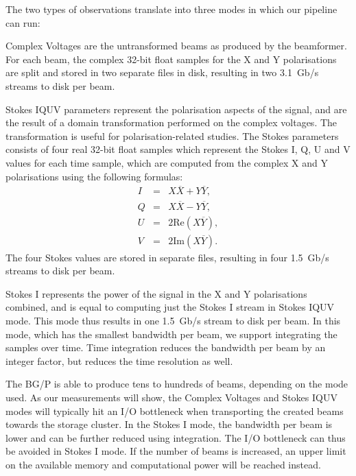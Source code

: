 \documentclass{llncs}
\begin{document}
The two types of observations translate into three modes in which our pipeline can run:
\begin{description}
\item{Complex Voltages} are the untransformed beams as produced by the beamformer. For each beam, the complex 32-bit float samples for the X and Y polarisations are split and stored in two separate files in disk, resulting in two 3.1~Gb/s streams to disk per beam.
\item{Stokes IQUV} parameters represent the polarisation aspects of the signal, and are the result of a domain transformation performed on the complex voltages. The transformation is useful for polarisation-related studies. The Stokes parameters consists of four real 32-bit float samples which represent the Stokes I, Q, U and V values for each time sample, which are computed from the complex X and Y polarisations using the following formulas:
\begin{eqnarray}
I & = & X\overline{X} + Y\overline{Y}, \\
Q & = & X\overline{X} - Y\overline{Y}, \\
U & = & 2\mathrm{Re}(X\overline{Y}), \\
V & = & 2\mathrm{Im}(X\overline{Y}).
\end{eqnarray}
The four Stokes values are stored in separate files, resulting in four 1.5~Gb/s streams to disk per beam. %
\item{Stokes I} represents the power of the signal in the X and Y polarisations combined, and is equal to computing just the Stokes I stream in Stokes IQUV mode. This mode thus results in one 1.5~Gb/s stream to disk per beam. In this mode, which has the smallest bandwidth per beam, we support integrating the samples over time. Time integration reduces the bandwidth per beam by an integer factor, but reduces the time resolution as well.
\end{description}

The BG/P is able to produce tens to hundreds of beams, depending on the mode used. As our measurements will show, the Complex Voltages and Stokes IQUV modes will typically hit an I/O bottleneck when transporting the created beams towards the storage cluster. In the Stokes I mode, the bandwidth per beam is lower and can be further reduced using integration. The I/O bottleneck can thus be avoided in Stokes I mode. If the number of beams is increased, an upper limit on the available memory and computational power will be reached instead.
\end{document}
